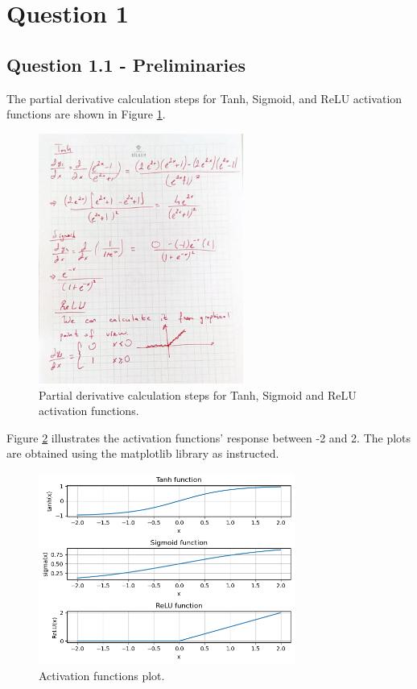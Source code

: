 \documentclass{assignment}
\date{\today}
\begin{document}
\section{Question 1}

\subsection*{Question 1.1 - Preliminaries}
The partial derivative calculation steps for Tanh, Sigmoid, and ReLU activation functions are shown in Figure \ref{partial_der}.

\begin{figure}[!htb]
    \centering
    \includegraphics[width=0.6\textwidth]{figures/partial_der.jpg}
    \caption{Partial derivative calculation steps for Tanh, Sigmoid and ReLU activation functions.}
    \label{partial_der}
\end{figure}

Figure \ref{fig:activation_functions} illustrates the activation functions' response between -2 and 2. The plots are obtained using the matplotlib library as instructed.

\begin{figure}[!htb]
    \centering
    \includegraphics[width=0.75\textwidth]{figures/q1_1.png}
    \caption{Activation functions plot.}
    \label{fig:activation_functions}
\end{figure}
\end{document}
